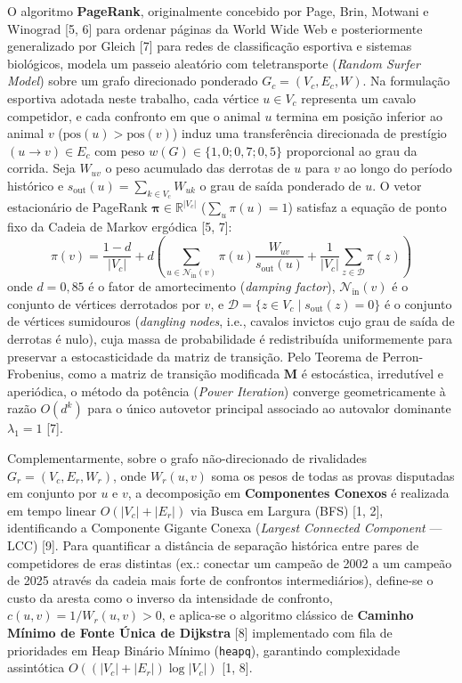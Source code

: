 \documentclass[conference]{IEEEtran}
\begin{document}
O algoritmo \textbf{PageRank}, originalmente concebido por Page, Brin, Motwani e Winograd [5, 6] para ordenar páginas da World Wide Web e posteriormente generalizado por Gleich [7] para redes de classificação esportiva e sistemas biológicos, modela um passeio aleatório com teletransporte (\textit{Random Surfer Model}) sobre um grafo direcionado ponderado $G_c = (V_c, E_c, W)$. Na formulação esportiva adotada neste trabalho, cada vértice $u \in V_c$ representa um cavalo competidor, e cada confronto em que o animal $u$ termina em posição inferior ao animal $v$ ($\text{pos}(u) > \text{pos}(v)$) induz uma transferência direcionada de prestígio $(u \to v) \in E_c$ com peso $w(G) \in \{1,0; 0,7; 0,5\}$ proporcional ao grau da corrida. Seja $W_{uv}$ o peso acumulado das derrotas de $u$ para $v$ ao longo do período histórico e $s_{\text{out}}(u) = \sum_{k \in V_c} W_{uk}$ o grau de saída ponderado de $u$. O vetor estacionário de PageRank $\boldsymbol{\pi} \in \mathbb{R}^{|V_c|}$ ($\sum_{u} \pi(u) = 1$) satisfaz a equação de ponto fixo da Cadeia de Markov ergódica [5, 7]:
\begin{equation}
    \pi(v) = \frac{1 - d}{|V_c|} + d \left( \sum_{u \in \mathcal{N}_{\text{in}}(v)} \pi(u) \frac{W_{uv}}{s_{\text{out}}(u)} + \frac{1}{|V_c|} \sum_{z \in \mathcal{D}} \pi(z) \right)
\end{equation}
onde $d = 0,85$ é o fator de amortecimento (\textit{damping factor}), $\mathcal{N}_{\text{in}}(v)$ é o conjunto de vértices derrotados por $v$, e $\mathcal{D} = \{z \in V_c \mid s_{\text{out}}(z) = 0\}$ é o conjunto de vértices sumidouros (\textit{dangling nodes}, i.e., cavalos invictos cujo grau de saída de derrotas é nulo), cuja massa de probabilidade é redistribuída uniformemente para preservar a estocasticidade da matriz de transição. Pelo Teorema de Perron-Frobenius, como a matriz de transição modificada $\mathbf{M}$ é estocástica, irredutível e aperiódica, o método da potência (\textit{Power Iteration}) converge geometricamente à razão $O(d^k)$ para o único autovetor principal associado ao autovalor dominante $\lambda_1 = 1$ [7].

Complementarmente, sobre o grafo não-direcionado de rivalidades $G_r = (V_c, E_r, W_r)$, onde $W_r(u, v)$ soma os pesos de todas as provas disputadas em conjunto por $u$ e $v$, a decomposição em \textbf{Componentes Conexos} é realizada em tempo linear $O(|V_c| + |E_r|)$ via Busca em Largura (BFS) [1, 2], identificando a Componente Gigante Conexa (\textit{Largest Connected Component} --- LCC) [9]. Para quantificar a distância de separação histórica entre pares de competidores de eras distintas (ex.: conectar um campeão de 2002 a um campeão de 2025 através da cadeia mais forte de confrontos intermediários), define-se o custo da aresta como o inverso da intensidade de confronto, $c(u, v) = 1 / W_r(u, v) > 0$, e aplica-se o algoritmo clássico de \textbf{Caminho Mínimo de Fonte Única de Dijkstra} [8] implementado com fila de prioridades em Heap Binário Mínimo (\texttt{heapq}), garantindo complexidade assintótica $O((|V_c| + |E_r|) \log |V_c|)$ [1, 8].
\end{document}
